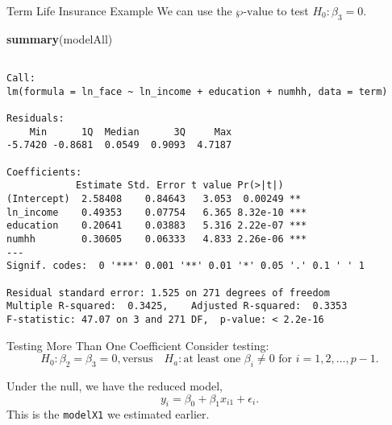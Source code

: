 \documentclass[
  ignorenonframetext,
]{beamer}
\newenvironment{Shaded}{\begin{snugshade}}{\end{snugshade}}
\newcommand{\FunctionTok}[1]{\textcolor[rgb]{0.13,0.29,0.53}{\textbf{#1}}}
\newcommand{\NormalTok}[1]{#1}
\begin{document}
\begin{frame}[fragile]{Term Life Insurance Example}
\protect\hypertarget{term-life-insurance-example-3}{}
We can use the \(\wp\text{-value}\) to test \(H_0:\beta_3=0\).

\scriptsize

\begin{Shaded}
\begin{Highlighting}[]
\FunctionTok{summary}\NormalTok{(modelAll)}
\end{Highlighting}
\end{Shaded}

\begin{verbatim}

Call:
lm(formula = ln_face ~ ln_income + education + numhh, data = term)

Residuals:
    Min      1Q  Median      3Q     Max 
-5.7420 -0.8681  0.0549  0.9093  4.7187 

Coefficients:
            Estimate Std. Error t value Pr(>|t|)    
(Intercept)  2.58408    0.84643   3.053  0.00249 ** 
ln_income    0.49353    0.07754   6.365 8.32e-10 ***
education    0.20641    0.03883   5.316 2.22e-07 ***
numhh        0.30605    0.06333   4.833 2.26e-06 ***
---
Signif. codes:  0 '***' 0.001 '**' 0.01 '*' 0.05 '.' 0.1 ' ' 1

Residual standard error: 1.525 on 271 degrees of freedom
Multiple R-squared:  0.3425,    Adjusted R-squared:  0.3353 
F-statistic: 47.07 on 3 and 271 DF,  p-value: < 2.2e-16
\end{verbatim}

\normalsize
\end{frame}

\begin{frame}[fragile]{Testing More Than One Coefficient}
\protect\hypertarget{testing-more-than-one-coefficient}{}
Consider testing:
\[H_0:\beta_2=\beta_3=0, \text{versus} \quad H_a: \text{at least one } \beta_i \neq 0 \text{ for } i = 1, 2, \ldots, p-1.\]

Under the null, we have the reduced model,
\[y_i=\beta_0+\beta_1 x_{i1}+\epsilon_i.\] This is the \texttt{modelX1}
we estimated earlier.
\end{frame}
\end{document}
